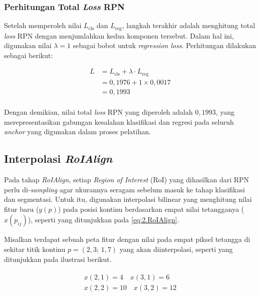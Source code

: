 \subsubsection{Perhitungan Total \textit{Loss} RPN}

Setelah memperoleh nilai $L_{\text{cls}}$ dan $L_{\text{reg}}$, langkah terakhir adalah menghitung total \textit{loss} RPN dengan menjumlahkan kedua komponen tersebut. Dalam hal ini, digunakan nilai $\lambda = 1$ sebagai bobot untuk \textit{regression loss}. Perhitungan dilakukan sebagai berikut:

\begin{align*}
    L &= L_{\text{cls}} + \lambda \cdot L_{\text{reg}} \\[0.5em]
     &= 0{,}1976 + 1 \times 0{,}0017 \\[0.5em]
     &= 0{,}1993 \\
\end{align*}

Dengan demikian, nilai total \textit{loss} RPN yang diperoleh adalah $0{,}1993$, yang merepresentasikan gabungan kesalahan klasifikasi dan regresi pada seluruh \textit{anchor} yang digunakan dalam proses pelatihan.
\subsection{Interpolasi \textit{RoIAlign}}

Pada tahap \textit{RoIAlign}, setiap \textit{Region of Interest} (RoI) yang dihasilkan dari RPN perlu di-\textit{sampling} agar ukurannya seragam sebelum masuk ke tahap klasifikasi dan segmentasi. Untuk itu, digunakan interpolasi bilinear yang menghitung nilai fitur baru ($y(p)$) pada posisi kontinu berdasarkan empat nilai tetangganya ($x(p_{ij})$), seperti yang ditunjukkan pada \ref{eq:2.RoIAlign}.

Misalkan terdapat sebuah peta fitur dengan nilai pada empat piksel tetangga di sekitar titik kontinu $p = (2{,}3;\,1{,}7)$ yang akan diinterpolasi, seperti yang ditunjukkan pada ilustrasi berikut.

\begin{align*}
\begin{matrix}
    x(2,1)=4 \quad x(3,1)=6 \\[0.5em]
    x(2,2)=10 \quad x(3,2)=12 \\[0.8em]
\end{matrix}
\end{align*}

